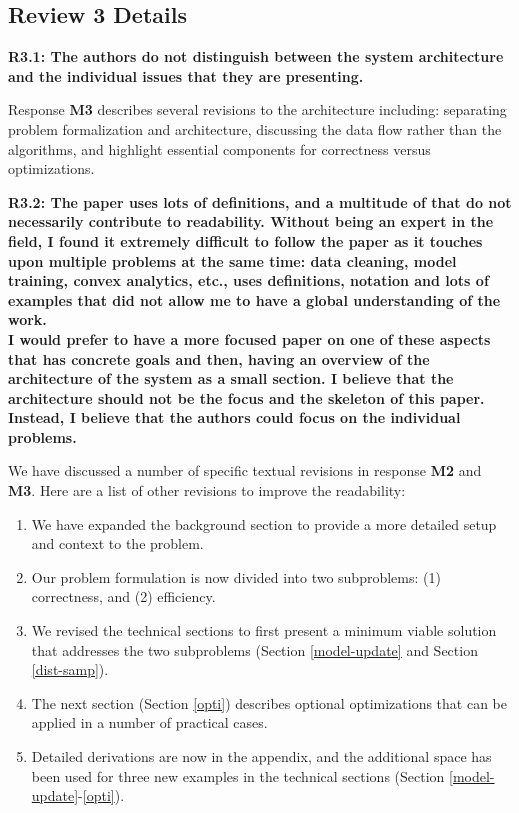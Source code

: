 \vspace{0.5em}


\subsection*{Review 3 Details}
\noindent\textbf{R3.1: The authors do not distinguish between the system architecture and the individual issues that they are presenting.}

Response \textbf{M3} describes several revisions to the architecture including: separating problem formalization and architecture, discussing the data flow rather than the algorithms, and highlight essential components for correctness versus optimizations.

\vspace{0.5em}

\noindent\textbf{R3.2: The paper uses lots of definitions, and a multitude of that do not necessarily contribute to readability.
Without being an expert in the field, I found it extremely difficult to follow the paper as it touches upon multiple problems at the same time: data cleaning, model training, convex analytics, etc., uses definitions, notation and lots of examples that did not allow me to have a global understanding of the work.\\
I would prefer to have a more focused paper on one of these aspects that has concrete goals and then, having an overview of the architecture of the system as a small section. I believe that the architecture should not be the focus and the skeleton of this paper. Instead, I believe that the authors could focus on the individual problems.}

We have discussed a number of specific textual revisions in response \textbf{M2} and \textbf{M3}. Here are a list of other revisions to improve the readability:

\begin{enumerate}
\item We have expanded the background section to provide a more detailed setup and context to the problem.
\item Our problem formulation is now divided into two subproblems: (1) correctness, and (2) efficiency.
\item We revised the technical sections to first present a minimum viable solution that addresses the two subproblems (Section \ref{model-update} and Section  \ref{dist-samp}).
\item The next section (Section \ref{opti}) describes optional optimizations that can be applied in a number of practical cases.
\item Detailed derivations are now in the appendix, and the additional space has been used for three new examples in the technical sections (Section \ref{model-update}-\ref{opti}).
\end{enumerate}
